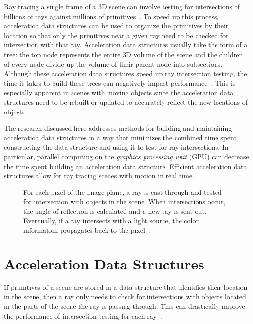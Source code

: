 \documentclass{sig-alternate}
\begin{document}
Ray tracing a single frame of a 3D scene can involve testing for intersections of billions of rays against millions of primitives~\cite{Gribble:2012, Wald:2007}. To speed up this process, acceleration data structures can be used to organize the primitives by their location so that only the primitives near a given ray need to be checked for intersection with that ray. Acceleration data structures usually take the form of a tree: the top node represents the entire 3D volume of the scene and the children of every node divide up the volume of their parent node into subsections. Although these acceleration data structures speed up ray intersection testing, the time it takes to build these trees can negatively impact performance~\cite{Garanzha:2011}. This is especially apparent in scenes with moving objects since the acceleration data structures need to be rebuilt or updated to accurately reflect the new locations of objects~\cite{Wald:2007}.

The research discussed here addresses methods for building and maintaining acceleration data structures in a way that minimizes the combined time spent constructing the data structure and using it to test for ray intersections. In particular, parallel computing on the \emph{graphics processing unit} (GPU) can decrease the time spent building an acceleration data structure. Efficient acceleration data structures allow for ray tracing scenes with motion in real time.

\begin{figure}
\centering
{}
\caption{For each pixel of the image plane, a ray is cast through and tested for intersection with objects in the scene. When intersections occur, the angle of reflection is calculated and a new ray is sent out. Eventually, if a ray intersects with a light source, the color information propagates back to the pixel~\cite{Gribble:2012, wiki:rayTracing}.}
\label{fig:ray_diagram}
\end{figure}

\section{Acceleration Data Structures}
\label{sec:accel}

If primitives of a scene are stored in a data structure that identifies their location in the scene, then a ray only needs to check for intersections with objects located in the parts of the scene the ray is passing through. This can drastically improve the performance of intersection testing for each ray~\cite{wiki:rayTracing}.
\end{document}
